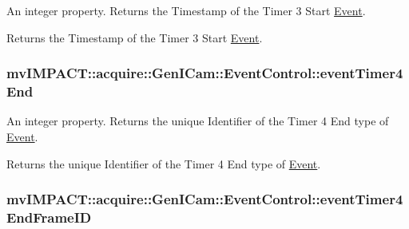 An integer property. Returns the Timestamp of the Timer 3 Start \hyperlink{classmv_i_m_p_a_c_t_1_1acquire_1_1_event}{Event}. 

Returns the Timestamp of the Timer 3 Start \hyperlink{classmv_i_m_p_a_c_t_1_1acquire_1_1_event}{Event}. \hypertarget{classmv_i_m_p_a_c_t_1_1acquire_1_1_gen_i_cam_1_1_event_control_abc14d9df3f58e60d47568e4571ae155d}{
\subsubsection[{event\+Timer4\+End}]{ mv\+I\+M\+P\+A\+C\+T\+::acquire\+::\+Gen\+I\+Cam\+::\+Event\+Control\+::event\+Timer4\+End}}\label{classmv_i_m_p_a_c_t_1_1acquire_1_1_gen_i_cam_1_1_event_control_abc14d9df3f58e60d47568e4571ae155d}


An integer property. Returns the unique Identifier of the Timer 4 End type of \hyperlink{classmv_i_m_p_a_c_t_1_1acquire_1_1_event}{Event}. 

Returns the unique Identifier of the Timer 4 End type of \hyperlink{classmv_i_m_p_a_c_t_1_1acquire_1_1_event}{Event}. \hypertarget{classmv_i_m_p_a_c_t_1_1acquire_1_1_gen_i_cam_1_1_event_control_a48b591168a671b1064025585638a5366}{
\subsubsection[{event\+Timer4\+End\+Frame\+I\+D}]{ mv\+I\+M\+P\+A\+C\+T\+::acquire\+::\+Gen\+I\+Cam\+::\+Event\+Control\+::event\+Timer4\+End\+Frame\+I\+D}}\label{classmv_i_m_p_a_c_t_1_1acquire_1_1_gen_i_cam_1_1_event_control_a48b591168a671b1064025585638a5366}


